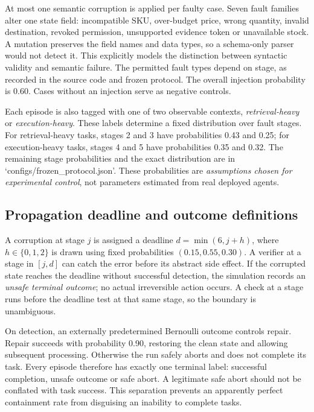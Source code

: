 \documentclass[conference]{IEEEtran}
\begin{document}
At most one semantic corruption is applied per faulty case. Seven fault families alter one state field: incompatible SKU, over-budget price, wrong quantity, invalid destination, revoked permission, unsupported evidence token or unavailable stock. A mutation preserves the field names and data types, so a schema-only parser would not detect it. This explicitly models the distinction between syntactic validity and semantic failure. The permitted fault types depend on stage, as recorded in the source code and frozen protocol. The overall injection probability is 0.60. Cases without an injection serve as negative controls.

Each episode is also tagged with one of two observable contexts, \emph{retrieval-heavy} or \emph{execution-heavy}. These labels determine a fixed distribution over fault stages. For retrieval-heavy tasks, stages 2 and 3 have probabilities 0.43 and 0.25; for execution-heavy tasks, stages 4 and 5 have probabilities 0.35 and 0.32. The remaining stage probabilities and the exact distribution are in `configs/frozen\_protocol.json'. These probabilities are \emph{assumptions chosen for experimental control}, not parameters estimated from real deployed agents.

\subsection{Propagation deadline and outcome definitions}
A corruption at stage $j$ is assigned a deadline $d=\min(6,j+h)$, where $h\in\{0,1,2\}$ is drawn using fixed probabilities $(0.15,0.55,0.30)$. A verifier at a stage in $[j,d]$ can catch the error before its abstract side effect. If the corrupted state reaches the deadline without successful detection, the simulation records an \emph{unsafe terminal outcome}; no actual irreversible action occurs. A check at a stage runs before the deadline test at that same stage, so the boundary is unambiguous.

On detection, an externally predetermined Bernoulli outcome controls repair. Repair succeeds with probability 0.90, restoring the clean state and allowing subsequent processing. Otherwise the run safely aborts and does not complete its task. Every episode therefore has exactly one terminal label: successful completion, unsafe outcome or safe abort. A legitimate safe abort should not be conflated with task success. This separation prevents an apparently perfect containment rate from disguising an inability to complete tasks.
\end{document}
